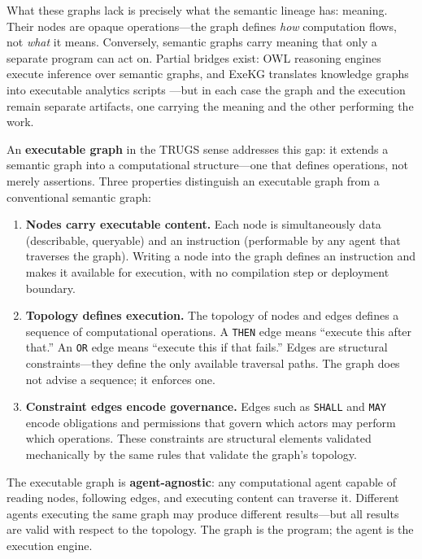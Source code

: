 \documentclass{article}
\begin{document}
What these graphs lack is precisely what the semantic lineage has: meaning. Their nodes are opaque operations---the graph defines \emph{how} computation flows, not \emph{what} it means. Conversely, semantic graphs carry meaning that only a separate program can act on. Partial bridges exist: OWL reasoning engines execute inference over semantic graphs, and ExeKG translates knowledge graphs into executable analytics scripts \citep{zheng2022executable}---but in each case the graph and the execution remain separate artifacts, one carrying the meaning and the other performing the work.

An \textbf{executable graph} in the TRUGS sense addresses this gap: it extends a semantic graph into a computational structure---one that defines operations, not merely assertions. Three properties distinguish an executable graph from a conventional semantic graph:

\begin{enumerate}
    \item \textbf{Nodes carry executable content.} Each node is simultaneously data (describable, queryable) and an instruction (performable by any agent that traverses the graph). Writing a node into the graph defines an instruction and makes it available for execution, with no compilation step or deployment boundary.

    \item \textbf{Topology defines execution.} The topology of nodes and edges defines a sequence of computational operations. A \texttt{THEN} edge means ``execute this after that.'' An \texttt{OR} edge means ``execute this if that fails.'' Edges are structural constraints---they define the only available traversal paths. The graph does not advise a sequence; it enforces one.

    \item \textbf{Constraint edges encode governance.} Edges such as \texttt{SHALL} and \texttt{MAY} encode obligations and permissions that govern which actors may perform which operations. These constraints are structural elements validated mechanically by the same rules that validate the graph's topology.
\end{enumerate}

The executable graph is \textbf{agent-agnostic}: any computational agent capable of reading nodes, following edges, and executing content can traverse it. Different agents executing the same graph may produce different results---but all results are valid with respect to the topology. The graph is the program; the agent is the execution engine.
\end{document}
